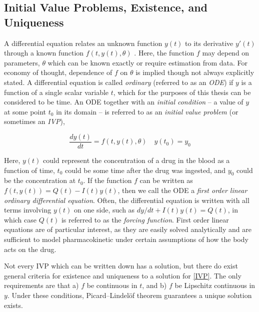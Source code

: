 \subsection{Initial Value Problems, Existence, and Uniqueness}

A differential equation relates an unknown function $y(t)$ to its derivative $y'(t)$ through a known function $f(t, y(t), \theta)$ \cite{morris1963ordinary}. Here, the function $f$ may depend on parameters, $\theta$ which can be known exactly or require estimation from data. For economy of thought, dependence of $f$ on $\theta$ is implied though not always explicitly stated. A differential equation is called \textit{ordinary} (referred to as an \textit{ODE}) if $y$ is a function of a single scalar variable $t$, which for the purposes of this thesis can be considered to be time. An ODE together with an \textit{initial condition} -- a value of $y$ at some point $t_0$ in its domain --  is referred to as an \textit{initial value problem} (or sometimes an \textit{IVP}), 

\begin{equation}\label{IVP}
	\dfrac{dy(t)}{dt} = f(t, y(t), \theta) \quad y(t_0) = y_0
\end{equation}

\noindent Here, $y(t)$ could represent the concentration of a drug in the blood as a function of time, $t_0$ could be some time after the drug was ingested, and $y_0$ could be the concentration at $t_0$.  If the function $f$ can be written as $f(t, y(t)) = Q(t) - I(t) y(t)$, then we call the ODE a \textit{first order linear ordinary differential equation}.  Often, the differential equation is written with all terms involving $y(t)$ on one side, such as $dy/dt + I(t) y(t) = Q(t)$, in which case $Q(t)$ is referred to as the \textit{forcing function}.  First order linear equations are of particular interest, as they are easily solved analytically and are sufficient to model pharmacokinetic under certain assumptions of how the body acts on the drug.


Not every IVP which can be written down has a solution, but there do exist general criteria for existence and uniqueness to a solution for \cref{IVP}.  The only requirements are that a) $f$ be continuous in $t$, and b) $f$ be Lipschitz continuous in $y$.  Under these conditions, Picard–Lindelöf theorem \cite{morris1963ordinary} guarantees a unique solution exists.

